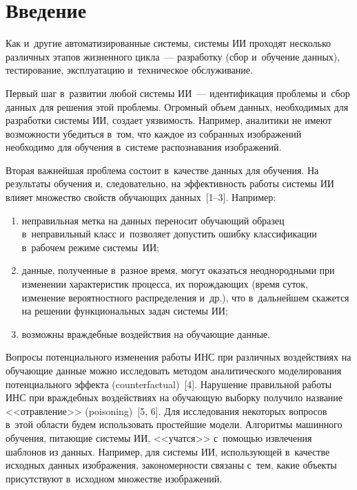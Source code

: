 \begin{multicols}{2}

\label{st\stat}
  
  \section{Введение}
  
\vspace*{-4pt}

  Как и~другие автоматизированные сис\-те\-мы, сис\-те\-мы 
ИИ проходят несколько различных этапов жизненного цикла~--- 
разработку (сбор и~обучение данных), тестирование, эксплуатацию и~техническое 
обслуживание.
  
  Первый шаг в~развитии любой системы ИИ~--- идентификация проблемы 
и~сбор данных для решения этой проблемы. Огромный объем данных, 
необходимых для разработки системы ИИ, создает уязвимость. Например, 
аналитики не имеют возможности убедиться в~том, что каждое  из собранных 
изображений необходимо для обучения в~системе распознавания изображений.
  
  Вторая важнейшая проблема состоит в~качестве данных для обучения. На 
результаты обучения и, следовательно, на эффективность работы сис\-те\-мы ИИ 
влияет множество свойств обучающих данных~[1--3]. Например:
  \begin{enumerate}[(1)]
\item неправильная метка на данных переносит обуча\-ющий образец 
в~неправильный класс и~позволяет допустить ошибку классификации 
в~рабочем режиме сис\-те\-мы~ИИ;\\[-14pt]
\item данные, полученные в~разное время, могут оказаться неоднородными 
при изменении характеристик процесса, их по\-рож\-да\-ющих (время суток, 
изменение вероятностного распределения и~др.), что в~дальнейшем скажется 
на решении функциональных задач системы ИИ;
\item возможны враждебные воздействия на обуча\-ющие данные.\\[-14pt]
\end{enumerate}

  Вопросы потенциального изменения работы ИНС при различных воздействиях на обуча\-ющие данные можно исследовать 
методом аналитического моделирования потенциального эффекта 
(counterfactual)~[4]. Нарушение правильной работы ИНС при враждебных 
воздействиях на обуча\-ющую выборку получило название <<отравление>> 
(poisoning)~[5, 6]. Для исследования некоторых вопросов в~этой об\-ласти будем 
использовать простейшие модели. Алгоритмы машинного обучения, питающие 
системы ИИ, <<учатся>> с~по\-мощью извлечения шаблонов из данных. 
Например, для системы ИИ, использующей в~качестве исходных данных 
изображения, закономерности связаны с~тем, какие объекты присутствуют 
в~исходном множестве изобра\-же\-ний.
  

\end{multicols}
